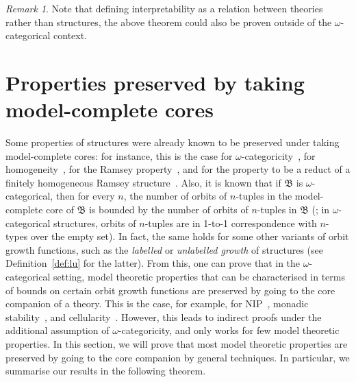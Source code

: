 \documentclass{amsart}
\theoremstyle{definition}
\theoremstyle{remark}
\newtheorem{remark}[theorem]{Remark}
\numberwithin{equation}{section}
\newcommand{\bB}{\mathfrak{B}}
\begin{document}
\begin{remark} Note that defining interpretability as a relation between theories rather than structures, the above theorem could also be proven outside of the $\omega$-categorical context. 
\end{remark}

\section{Properties preserved by taking model-complete cores}\label{sec:preserved}
Some properties of structures were already known to be preserved under taking model-complete cores: 
for instance, this is the case for $\omega$-categoricity~\cite{Cores-journal,BodHilsMartin-Journal}, for homogeneity~\cite[Proposition 4.7.7.(1)]{Book}, for the Ramsey property~\cite{Bod-New-Ramsey-classes}, 
and for the property to be a reduct
of a finitely homogeneous Ramsey structure~\cite{MottetPinskerCores}. 
Also, it is known that if $\bB$ is $\omega$-categorical, then for every $n$, the number of orbits of $n$-tuples in the model-complete core of $\bB$ is bounded by the number of orbits of $n$-tuples in $\bB$ (\cite[Proposition 4.7.7.(4)]{Book}; in $\omega$-categorical structures, orbits of $n$-tuples are in 1-to-1 correspondence with $n$-types over the empty set). In fact, the same holds for some other variants of orbit growth functions, such as the \emph{labelled} or \emph{unlabelled growth} of structures (see Definition~\ref{def:lu} for the latter). From this, one can prove that in the $\omega$-categorical setting, model theoretic properties that can be characterised in terms of bounds on certain orbit growth functions are preserved by going to the core companion  of a theory. This is the case, for example, for $\mathrm{NIP}$~\cite{Macpherson-RapidGrowth}, monadic stability~\cite{braunfeld2022monadic,bodor2025labelled}, and cellularity~\cite{bodor2024classification,bodirsky2021permutation}. However, this leads to indirect proofs under the additional assumption of $\omega$-categoricity, and only works for few model theoretic properties. In this section, we will prove that most model theoretic properties are preserved by going to the core companion  by general techniques. In particular, we summarise our results in the following theorem.
\end{document}
